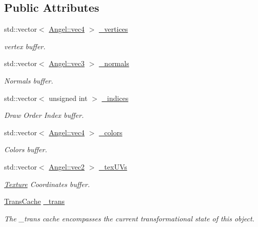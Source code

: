 \subsection*{Public Attributes}
\begin{DoxyCompactItemize}
\item 
std\-::vector$<$ \hyperlink{struct_angel_1_1vec4}{Angel\-::vec4} $>$ \hyperlink{class_object_a4ac354b3ec284f27358b1d4b8d95b9a9}{\-\_\-vertices}
\begin{DoxyCompactList}\small\item\em vertex buffer. \end{DoxyCompactList}\item 
std\-::vector$<$ \hyperlink{struct_angel_1_1vec3}{Angel\-::vec3} $>$ \hyperlink{class_object_a20bb786cb5915934853855aab9d1a1b3}{\-\_\-normals}
\begin{DoxyCompactList}\small\item\em Normals buffer. \end{DoxyCompactList}\item 
std\-::vector$<$ unsigned int $>$ \hyperlink{class_object_ab85adc7a2d3b891051c096593982653d}{\-\_\-indices}
\begin{DoxyCompactList}\small\item\em Draw Order Index buffer. \end{DoxyCompactList}\item 
std\-::vector$<$ \hyperlink{struct_angel_1_1vec4}{Angel\-::vec4} $>$ \hyperlink{class_object_a29a0e9959c490067db69378bf57a17ba}{\-\_\-colors}
\begin{DoxyCompactList}\small\item\em Colors buffer. \end{DoxyCompactList}\item 
std\-::vector$<$ \hyperlink{struct_angel_1_1vec2}{Angel\-::vec2} $>$ \hyperlink{class_object_aa9ddc3b95d74b76ab8a251fb376dfafb}{\-\_\-tex\-U\-Vs}
\begin{DoxyCompactList}\small\item\em \hyperlink{class_texture}{Texture} Coordinates buffer. \end{DoxyCompactList}\item 
\hypertarget{class_object_af17d57ea2dab64e21112e8949d50d85f}{\hyperlink{class_trans_cache}{Trans\-Cache} \hyperlink{class_object_af17d57ea2dab64e21112e8949d50d85f}{\-\_\-trans}}\label{class_object_af17d57ea2dab64e21112e8949d50d85f}

\begin{DoxyCompactList}\small\item\em The \-\_\-trans cache encompasses the current transformational state of this object. \end{DoxyCompactList}\end{DoxyCompactItemize}
